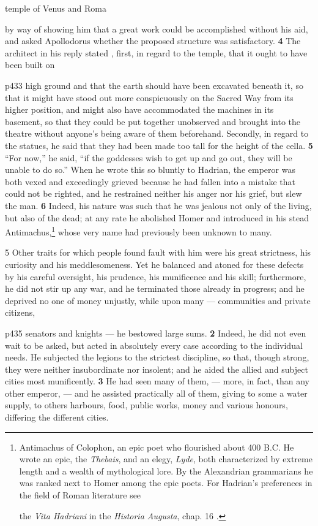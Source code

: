 temple of Venus and Roma

by way of showing him that a great work could be accomplished without his aid, and asked Apollodorus whether the proposed structure was satisfactory. \textbf{4} The architect in his reply stated , first, in regard to the temple, that it ought to have been built on

p433 high ground and that the earth should have been excavated beneath it, so that it might have stood out more conspicuously on the Sacred Way from its higher position, and might also have accommodated the machines in its basement, so that they could be put together unobserved and brought into the theatre without anyone's being aware of them beforehand. Secondly, in regard to the statues, he said that they had been made too tall for the height of the cella. \textbf{5} ``For now,'' he said, ``if the goddesses wish to get up and go out, they will be unable to do so.'' When he wrote this so bluntly to Hadrian, the emperor was both vexed and exceedingly grieved because he had fallen into a mistake that could not be righted, and he restrained neither his anger nor his grief, but slew the man. \textbf{6} Indeed, his nature was such that he was jealous not only of the living, but also of the dead; at any rate he abolished Homer and introduced in his stead Antimachus,\texthebrew{⁠}\footnote{Antimachus of Colophon, an epic poet who flourished about 400 B.C. He wrote an epic, the \emph{Thebais}, and an elegy, \emph{Lyde}, both characterized by extreme length and a wealth of mythological lore. By the Alexandrian grammarians he was ranked next to Homer among the epic poets. For Hadrian's preferences in the field of Roman literature see

the \emph{Vita Hadriani} in the \emph{Historia Augusta}, chap. 16 .

} whose very name had previously been unknown to many.

5 Other traits for which people found fault with him were his great strictness, his curiosity and his meddlesomeness. Yet he balanced and atoned for these defects by his careful oversight, his prudence, his munificence and his skill; furthermore, he did not stir up any war, and he terminated those already in progress; and he deprived no one of money unjustly, while upon many \texthebrew{—} communities and private citizens,

p435 senators and knights \texthebrew{—} he bestowed large sums. \textbf{2} Indeed, he did not even wait to be asked, but acted in absolutely every case according to the individual needs. He subjected the legions to the strictest discipline, so that, though strong, they were neither insubordinate nor insolent; and he aided the allied and subject cities most munificently. \textbf{3} He had seen many of them, \texthebrew{—} more, in fact, than any other emperor, \texthebrew{—} and he assisted practically all of them, giving to some a water supply, to others harbours, food, public works, money and various honours, differing the different cities.

